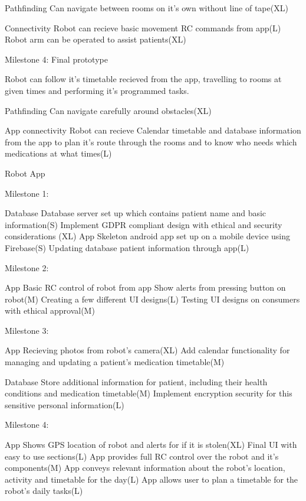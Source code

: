 \documentclass{article}
\begin{document}
Pathfinding
    Can navigate between rooms on it's own without line of tape(XL)
    
Connectivity 
    Robot can recieve basic movement RC commands from app(L)
    Robot arm can be operated to assist patients(XL)   
   
    
Milestone 4: Final prototype

Robot can follow it's timetable recieved from the app, travelling to rooms at given times and performing it's programmed tasks.

Pathfinding
    Can navigate carefully around obstacles(XL)       
    
App connectivity 
    Robot can recieve Calendar timetable and database information from the app to plan it's route through the rooms and to know who needs which medications at what times(L)
    
Robot App

Milestone 1:

Database
    Database server set up which contains patient name and basic information(S)
    Implement GDPR compliant design with ethical and security considerations (XL)
App
    Skeleton android app set up on a mobile device using Firebase(S)
    Updating database patient information through app(L)
    
Milestone 2:

App
    Basic RC control of robot from app
    Show alerts from pressing button on robot(M)
    Creating a few different UI designs(L)
    Testing UI designs on consumers with ethical approval(M)
    
Milestone 3:

App
    Recieving photos from robot's camera(XL)
    Add calendar functionality for managing and updating a patient's medication timetable(M)

Database
    Store additional information for patient, including their health conditions and medication timetable(M)
    Implement encryption security for this sensitive personal information(L)

Milestone 4:

App
    Shows GPS location of robot and alerts for if it is stolen(XL)
    Final UI with easy to use sections(L)
    App provides full RC control over the robot and it's components(M)
    App conveys relevant information about the robot's location, activity and timetable for the day(L)
    App allows user to plan a timetable for the robot's daily tasks(L)
   
    
\end{document}

